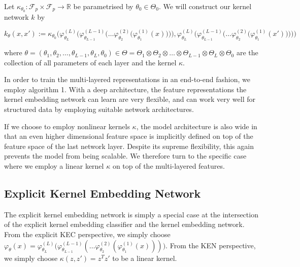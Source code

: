\documentclass{article}
\numberwithin{equation}{section}
\numberwithin{table}{section}
\numberwithin{algorithm}{section}
\begin{document}
		Let $\kappa_{\theta_{0}} : \mathcal{F}_{p} \times \mathcal{F}_{p} \to \mathbb{R}$ be parametrised by $\theta_{0} \in \Theta_{0}$. We will construct our kernel network $k$ by
		
		\begin{equation}
			k_{\theta}(x, x') := \kappa_{\theta_{0}}\Bigg( \varphi^{(L)}_{\theta_{L}}\bigg(\varphi^{(L - 1)}_{\theta_{L - 1}}\Big(\dots\varphi^{(2)}_{\theta_{2}}\big(\varphi^{(1)}_{\theta_{1}}(x)\big)\Big)\bigg), \varphi^{(L)}_{\theta_{L}}\bigg(\varphi^{(L - 1)}_{\theta_{L - 1}}\Big(\dots\varphi^{(2)}_{\theta_{2}}\big(\varphi^{(1)}_{\theta_{1}}(x')\big)\Big)\bigg) \Bigg)
		\label{eq:deep_kernel_embedding_network}
		\end{equation}
		
		where $\theta = (\theta_{1}, \theta_{2}, \dots, \theta_{L -1}, \theta_{L}, \theta_{0}) \in \Theta = \Theta_{1} \otimes \Theta_{2} \otimes \dots \otimes \Theta_{L - 1} \otimes \Theta_{L} \otimes \Theta_{0}$ are the collection of all parameters of each layer and the kernel $\kappa$.
		
		In order to train the multi-layered representations in an end-to-end fashion, we employ algorithm 1. With a deep architecture, the feature representations the kernel embedding network can learn are very flexible, and can work very well for structured data by employing suitable network architectures.
		
		If we choose to employ nonlinear kernels $\kappa$, the model architecture is also wide in that an even higher dimensional feature space is implicitly defined on top of the feature space of the last network layer. Despite its supreme flexibility, this again prevents the model from being scalable. We therefore turn to the specific case where we employ a linear kernel $\kappa$ on top of the multi-layered features.

	\subsection{Explicit Kernel Embedding Network}
	\label{app:explicit_kernel_embedding_network}

		The explicit kernel embedding network is simply a special case at the intersection of the explicit kernel embedding classifier and the kernel embedding network. From the explicit KEC perspective, we simply choose $\varphi_{\theta}(x) = \varphi^{(L)}_{\theta_{L}}\big(\varphi^{(L - 1)}_{\theta_{L - 1}}(\dots\varphi^{(2)}_{\theta_{2}}(\varphi^{(1)}_{\theta_{1}}(x)))\big)$. From the KEN perspective, we simply choose $\kappa(z, z') = z^{T} z'$ to be a linear kernel.
		
\end{document}
